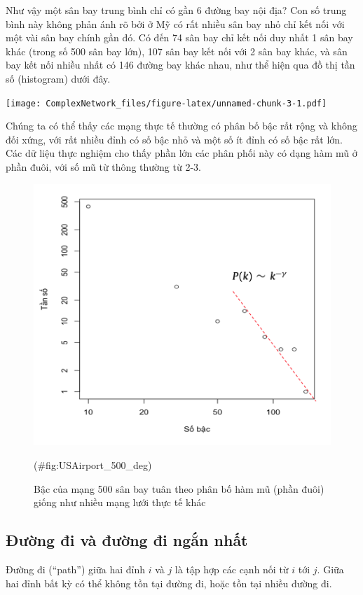 \documentclass[]{book}
\begin{document}
Như vậy một sân bay trung bình chỉ có gần 6 đường bay nội địa? Con số
trung bình này không phản ánh rõ bởi ở Mỹ có rất nhiều sân bay nhỏ chỉ
kết nối với một vài sân bay chính gần đó. Có đến 74 sân bay chỉ kết nối
duy nhất 1 sân bay khác (trong số 500 sân bay lớn), 107 sân bay kết nối
với 2 sân bay khác, và sân bay kết nối nhiều nhất có 146 đường bay khác
nhau, như thể hiện qua đồ thị tần số (histogram) dưới đây.

\texttt{[image: ComplexNetwork\_files/figure-latex/unnamed-chunk-3-1.pdf]}

Chúng ta có thể thấy các mạng thực tế thường có phân bố bậc rất rộng và
không đối xứng, với rất nhiều đỉnh có số bậc nhỏ và một số ít đỉnh có số
bậc rất lớn. Các dữ liệu thực nghiệm cho thấy phần lớn các phân phối này
có dạng hàm mũ ở phần đuôi, với số mũ từ thông thường từ 2-3.

\begin{figure}

{\centering \includegraphics[width=0.8\linewidth]{images/USAirport_500_deg} 

}

\caption{Bậc của mạng 500 sân bay tuân theo phân bố hàm mũ (phần đuôi) giống như nhiều mạng lưới thực tế khác}(\#fig:USAirport_500_deg)
\end{figure}

\subsection{Đường đi và đường đi ngắn
nhất}\label{ung-i-va-ung-i-ngn-nht}

Đường đi (``path'') giữa hai đỉnh \(i\) và \(j\) là tập hợp các cạnh nối
từ \(i\) tới \(j\). Giữa hai đỉnh bất kỳ có thể không tồn tại đường đi,
hoặc tồn tại nhiều đường đi.
\end{document}
